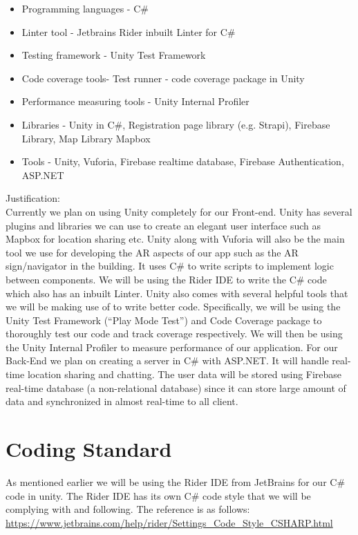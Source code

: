 \documentclass{article}
\begin{document}
\begin{itemize}
  \item Programming languages - C\#
  \item Linter tool - Jetbrains Rider inbuilt Linter for C\#
  \item Testing framework - Unity Test Framework
  \item Code coverage tools- Test runner - code coverage package in Unity
  \item Performance measuring tools - Unity Internal Profiler
  \item Libraries - Unity in C\#, Registration page library (e.g. Strapi), Firebase Library, Map Library Mapbox
  \item Tools - Unity, Vuforia, Firebase realtime database, Firebase Authentication, ASP.NET
  \end{itemize}
  Justification: \\
  Currently we plan on using Unity completely for our Front-end. Unity has several plugins and libraries  we can use to create an elegant user interface such as Mapbox for location sharing etc. Unity along with Vuforia will also be the main tool we use for developing the AR aspects of our app such as the AR sign/navigator in the building. It uses C\# to write scripts to implement logic between components. We will be using the Rider IDE to write the C\# code which also has an inbuilt Linter. Unity also comes with several helpful tools that we will be making use of to write better code. Specifically, we will be using the Unity Test Framework (``Play Mode Test'') and Code Coverage package to thoroughly test our code and track coverage respectively. We will then be using the Unity Internal Profiler to measure performance of our application. For our Back-End we plan on creating a server in C\# with ASP.NET. It will handle real-time location sharing and chatting. The user data will be stored using Firebase real-time database (a non-relational database) since it can store large amount of data and synchronized in almost real-time to all client. 

\section{Coding Standard}

As mentioned earlier we will be using the Rider IDE from JetBrains for our C\# code in unity. The Rider IDE has its own C\# code style that we will be complying with and following. The reference is as follows: \\
\url{https://www.jetbrains.com/help/rider/Settings_Code_Style_CSHARP.html}
\end{document}
